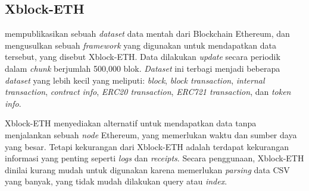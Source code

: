 \subsection{Xblock-ETH}
\label{subsec:xblock-eth}

\cite{zheng2020xblock} mempublikasikan sebuah \textit{dataset} data mentah dari Blockchain Ethereum, dan mengusulkan sebuah \textit{framework} yang digunakan untuk mendapatkan data tersebut, yang disebut Xblock-ETH. Data dilakukan \textit{update} secara periodik dalam \textit{chunk} berjumlah 500,000 blok. \textit{Dataset} ini terbagi menjadi beberapa \textit{dataset} yang lebih kecil yang meliputi: \textit{block}, \textit{block transaction}, \textit{internal transaction}, \textit{contract info}, \textit{ERC20 transaction}, \textit{ERC721 transaction}, dan \textit{token info}.

Xblock-ETH menyediakan alternatif untuk mendapatkan data tanpa menjalankan sebuah \textit{node} Ethereum, yang memerlukan waktu dan sumber daya yang besar. Tetapi kekurangan dari Xblock-ETH adalah terdapat kekurangan informasi yang penting seperti \textit{logs} dan \textit{receipts}. Secara penggunaan, Xblock-ETH dinilai kurang mudah untuk digunakan karena memerlukan \textit{parsing} data CSV yang banyak, yang tidak mudah dilakukan query atau \textit{index}.

